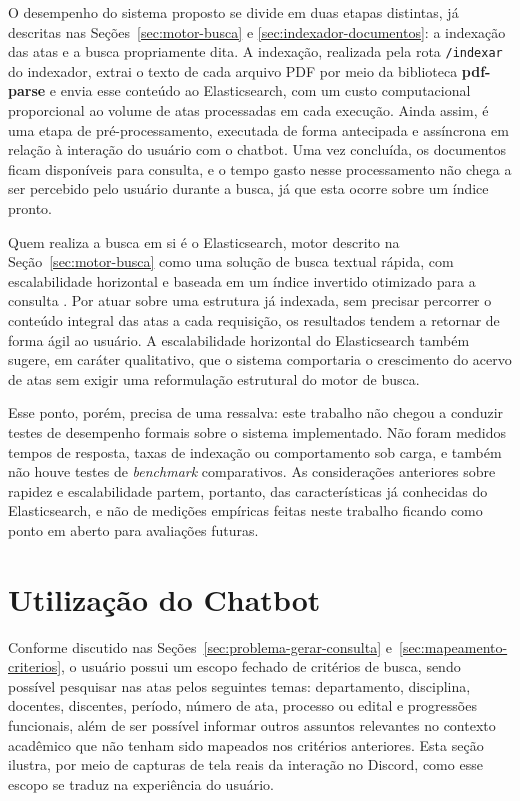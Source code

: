 O desempenho do sistema proposto se divide em duas etapas distintas, já descritas nas Seções~\ref{sec:motor-busca} e \ref{sec:indexador-documentos}: a indexação das atas e a busca propriamente dita. A indexação, realizada pela rota \texttt{/indexar} do indexador, extrai o texto de cada arquivo PDF por meio da biblioteca \textbf{pdf-parse} e envia esse conteúdo ao Elasticsearch, com um custo computacional proporcional ao volume de atas processadas em cada execução. Ainda assim, é uma etapa de pré-processamento, executada de forma antecipada e assíncrona em relação à interação do usuário com o chatbot. Uma vez concluída, os documentos ficam disponíveis para consulta, e o tempo gasto nesse processamento não chega a ser percebido pelo usuário durante a busca, já que esta ocorre sobre um índice pronto.

Quem realiza a busca em si é o Elasticsearch, motor descrito na Seção~\ref{sec:motor-busca} como uma solução de busca textual rápida, com escalabilidade horizontal e baseada em um índice invertido otimizado para a consulta \cite{IBMElasticsearch}. Por atuar sobre uma estrutura já indexada, sem precisar percorrer o conteúdo integral das atas a cada requisição, os resultados tendem a retornar de forma ágil ao usuário. A escalabilidade horizontal do Elasticsearch também sugere, em caráter qualitativo, que o sistema comportaria o crescimento do acervo de atas sem exigir uma reformulação estrutural do motor de busca.

Esse ponto, porém, precisa de uma ressalva: este trabalho não chegou a conduzir testes de desempenho formais sobre o sistema implementado. Não foram medidos tempos de resposta, taxas de indexação ou comportamento sob carga, e também não houve testes de \textit{benchmark} comparativos. As considerações anteriores sobre rapidez e escalabilidade partem, portanto, das características já conhecidas do Elasticsearch, e não de medições empíricas feitas neste trabalho ficando como ponto em aberto para avaliações futuras.

\section{Utilização do Chatbot}\label{sec:utilizacao-chatbot}

Conforme discutido nas Seções~\ref{sec:problema-gerar-consulta} e~\ref{sec:mapeamento-criterios}, o usuário possui um escopo fechado de critérios de busca, sendo possível pesquisar nas atas pelos seguintes temas: departamento, disciplina, docentes, discentes, período, número de ata, processo ou edital e progressões funcionais, além de ser possível informar outros assuntos relevantes no contexto acadêmico que não tenham sido mapeados nos critérios anteriores. Esta seção ilustra, por meio de capturas de tela reais da interação no Discord, como esse escopo se traduz na experiência do usuário.


